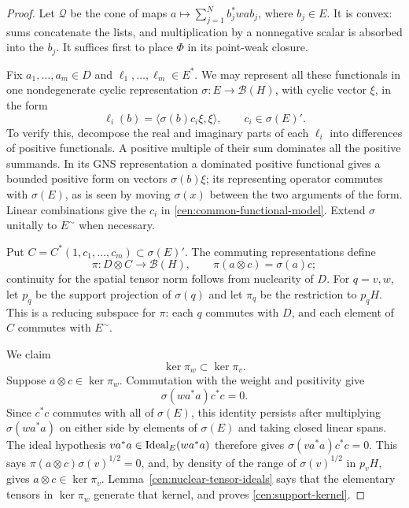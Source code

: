 \begin{proof}
Let $\mathcal Q$ be the cone of maps
$a\mapsto\sum_{j=1}^N b_j^*wa b_j$, where $b_j\in E$.
It is convex: sums concatenate the lists, and multiplication by a
nonnegative scalar is absorbed into the $b_j$.  It suffices first to
place $\Phi$ in its point-weak closure.

Fix $a_1,\ldots,a_m\in D$ and $\ell_1,\ldots,\ell_m\in E^*$.
We may represent all these functionals in one nondegenerate cyclic
representation $\sigma:E\to\mathcal B(H)$, with cyclic vector $\xi$,
in the form
\begin{equation}\label{cen:common-functional-model}
 \ell_i(b)=\langle\sigma(b)c_i\xi,\xi\rangle,
 \qquad c_i\in\sigma(E)'.
\end{equation}
To verify this, decompose the real and imaginary parts of each
$\ell_i$ into differences of positive functionals.  A positive multiple
of their sum dominates all the positive summands.  In its GNS
representation a dominated positive functional gives a bounded positive
form on vectors $\sigma(b)\xi$; its representing operator commutes
with $\sigma(E)$, as is seen by moving $\sigma(x)$ between the two
arguments of the form.  Linear combinations give the $c_i$ in
\eqref{cen:common-functional-model}.  Extend $\sigma$ unitally to
$E^{\sim}$ when necessary.

Put $C=C^*(1,c_1,\ldots,c_m)\subset\sigma(E)'$.  The commuting
representations define
\[
 \pi:D\otimes C\longrightarrow\mathcal B(H),\qquad
 \pi(a\otimes c)=\sigma(a)c;
\]
continuity for the spatial tensor norm follows from nuclearity of $D$.
For $q=v,w$, let $p_q$ be the support projection of $\sigma(q)$ and
let $\pi_q$ be the restriction to $p_qH$.  This is a reducing subspace
for $\pi$: each $q$ commutes with $D$, and each element of $C$ commutes
with $E^{\sim}$.

We claim
\begin{equation}\label{cen:support-kernel}
 \ker\pi_w\subset\ker\pi_v.
\end{equation}
Suppose $a\otimes c\in\ker\pi_w$.  Commutation with the weight
and positivity give
\[
 \sigma(wa^*a)c^*c=0.
\]
Since $c^*c$ commutes with all of $\sigma(E)$, this identity persists
after multiplying $\sigma(wa^*a)$ on either side by elements of
$\sigma(E)$ and taking closed linear spans.  The ideal hypothesis
$va^*a\in\operatorname{Ideal}_E(wa^*a)$ therefore gives
$\sigma(va^*a)c^*c=0$.  This says
$\pi(a\otimes c)\sigma(v)^{1/2}=0$, and, by density of the range of
$\sigma(v)^{1/2}$ in $p_vH$, gives $a\otimes c\in\ker\pi_v$.
Lemma~\ref{cen:nuclear-tensor-ideals} says that the elementary tensors
in $\ker\pi_w$ generate that kernel, and proves
\eqref{cen:support-kernel}.


\end{proof}
